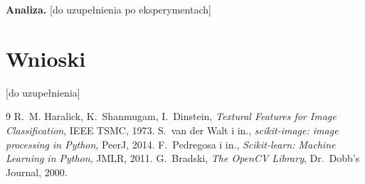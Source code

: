 \documentclass[10pt,a4paper]{article}
\begin{document}
\textbf{Analiza.} %
[do uzupełnienia po eksperymentach]

\section{Wnioski}
[do uzupełnienia]

\begin{thebibliography}{9}
\small
{} R.~M. Haralick, K.~Shanmugam, I.~Dinstein,
  \emph{Textural Features for Image Classification}, IEEE TSMC, 1973.
 S.~van der Walt i in.,
  \emph{scikit-image: image processing in Python}, PeerJ, 2014.
 F.~Pedregosa i in.,
  \emph{Scikit-learn: Machine Learning in Python}, JMLR, 2011.
 G.~Bradski, \emph{The OpenCV Library}, Dr.~Dobb's Journal, 2000.
\end{thebibliography}
\end{document}
